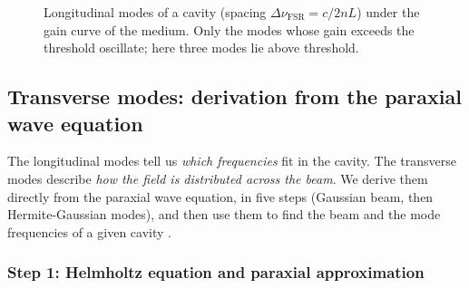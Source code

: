 \documentclass[11pt,a4paper]{article}
\newcommand{\FSR}{\Delta\nu_{\mathrm{FSR}}}
\begin{document}
	\begin{figure}[ht]
		\centering
		\caption{Longitudinal modes of a cavity (spacing $\FSR=c/2nL$) under the gain curve of the medium. Only the modes whose gain exceeds the threshold oscillate; here three modes lie above threshold.}
		\label{fig:longmodes}
	\end{figure}
	
	\subsection{Transverse modes: derivation from the paraxial wave equation}
	\label{sec:transverse}
	
	The longitudinal modes tell us \emph{which frequencies} fit in the cavity. The transverse modes describe \emph{how the field is distributed across the beam}. We derive them directly from the paraxial wave equation, in five steps (Gaussian beam, then Hermite-Gaussian modes), and then use them to find the beam and the mode frequencies of a given cavity \cite{Siegman,SalehTeich,KogelnikLi1966}.
	
	\subsubsection*{Step 1: Helmholtz equation and paraxial approximation}
	
\end{document}
